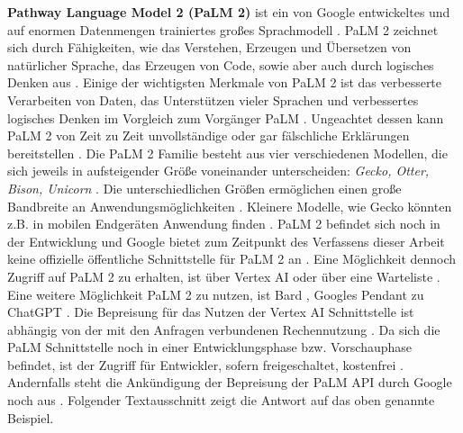 \textbf{Pathway Language Model 2 (PaLM 2)} \cite{google-blog-io-23} ist ein von Google entwickeltes und auf enormen Datenmengen trainiertes großes Sprachmodell \cite{google-palm2-techreport}.
PaLM 2 zeichnet sich durch Fähigkeiten, wie das Verstehen, Erzeugen und Übersetzen von natürlicher Sprache, das Erzeugen von Code, sowie aber auch durch logisches Denken aus \cite{google-blog-io-23,google-palm2-techreport}.
Einige der wichtigsten Merkmale von PaLM 2 ist das verbesserte Verarbeiten von Daten, das Unterstützen vieler Sprachen und verbessertes logisches Denken im Vorgleich zum Vorgänger PaLM \cite{google-palm2-techreport}.
Ungeachtet dessen kann PaLM 2 von Zeit zu Zeit unvollständige oder gar fälschliche Erklärungen bereitstellen \cite{google-bard-faq}.
Die PaLM 2 Familie besteht aus vier verschiedenen Modellen, die sich jeweils in aufsteigender Größe voneinander unterscheiden: \textit{Gecko, Otter, Bison, Unicorn} \cite{google-blog-io-23}.
Die unterschiedlichen Größen ermöglichen einen große Bandbreite an Anwendungsmöglichkeiten \cite{google-blog-io-23}.
Kleinere Modelle, wie Gecko könnten z.B. in mobilen Endgeräten Anwendung finden \cite{google-blog-io-23}.
PaLM 2 befindet sich noch in der Entwicklung und Google bietet zum Zeitpunkt des Verfassens dieser Arbeit keine offizielle öffentliche Schnittstelle für PaLM 2 an \cite{google-palm-api-announcement}.
Eine Möglichkeit dennoch Zugriff auf PaLM 2 zu erhalten, ist über Vertex AI oder über eine Warteliste \cite{google-palm-api-vertex-ai-waitlist}.
Eine weitere Möglichkeit PaLM 2 zu nutzen, ist Bard \cite{google-bard}, Googles Pendant zu ChatGPT \cite{openai-chatgpt}.
Die Bepreisung für das Nutzen der Vertex AI Schnittstelle ist abhängig von der mit den Anfragen verbundenen Rechennutzung \cite{google-vertex-ai-pricing}.
Da sich die PaLM Schnittstelle noch in einer Entwicklungsphase bzw. Vorschauphase befindet, ist der Zugriff für Entwickler, sofern freigeschaltet, kostenfrei \cite{google-palm-api-faq}.
Andernfalls steht die Ankündigung der Bepreisung der PaLM API durch Google noch aus \cite{google-palm-api-faq}.
Folgender Textausschnitt zeigt die Antwort auf das oben genannte Beispiel.
